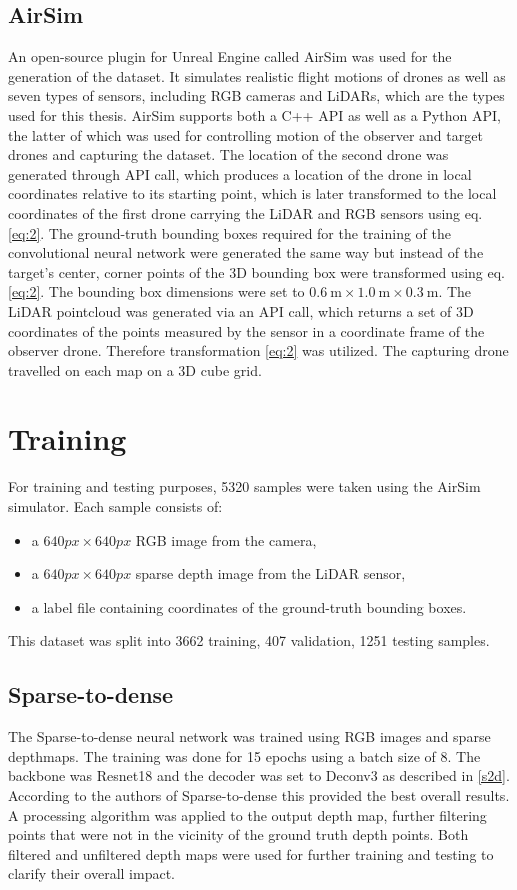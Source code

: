 \documentclass[twoside]{ctuthesis}
\theoremstyle{plain}
\theoremstyle{definition}
\theoremstyle{note}
\begin{document}
\subsection{AirSim}
An open-source plugin for Unreal Engine called AirSim was used for the generation of the dataset. It simulates realistic flight motions of drones as well as seven types of sensors, including RGB cameras and LiDARs, which are the types used for this thesis. AirSim supports both a C++ API as well as a Python API, the latter of which was used for controlling motion of the observer and target drones and capturing the dataset. The location of the second drone was generated through API call, which produces a location of the drone in local coordinates relative to its starting point, which is later transformed to the local coordinates of the first drone carrying the LiDAR and RGB sensors using eq. \eqref{eq:2}. The ground-truth bounding boxes required for the training of the convolutional neural network were generated the same way but instead of the target's center, corner points of the 3D bounding box were transformed using eq.\eqref{eq:2}. The bounding box dimensions were set to $\SI{0.6}{\metre} \times \SI{1.0}{\metre} \times \SI{0.3}{\metre}$. The LiDAR pointcloud was generated via an API call, which returns a set of 3D coordinates of the points measured by the sensor in a coordinate frame of the observer drone. Therefore transformation \eqref{eq:2} was utilized. The capturing drone travelled on each map on a 3D cube grid.
\section{Training}
For training and testing purposes, 5320 samples were taken using the AirSim simulator. Each sample consists of:
\begin{itemize}
	\item a $640px \times 640px$ RGB image from the camera,
	\item a $640px \times 640px$ sparse depth image from the LiDAR sensor,
	\item a label file containing coordinates of the ground-truth bounding boxes.
\end{itemize}
This dataset was split into 3662 training, 407 validation, 1251 testing samples.
\subsection{Sparse-to-dense}
The Sparse-to-dense neural network was trained using RGB images and sparse depthmaps. The training was done for 15 epochs using a batch size of 8. The backbone was Resnet18 and the decoder was set to Deconv3 as described in \autoref{s2d}. According to the authors of Sparse-to-dense \cite{ma2018sparsetodense} this provided the best overall results. A processing algorithm was applied to the output depth map, further filtering points that were not in the vicinity of the ground truth depth points. Both filtered and unfiltered depth maps were used for further training and testing to clarify their overall impact.
\end{document}
